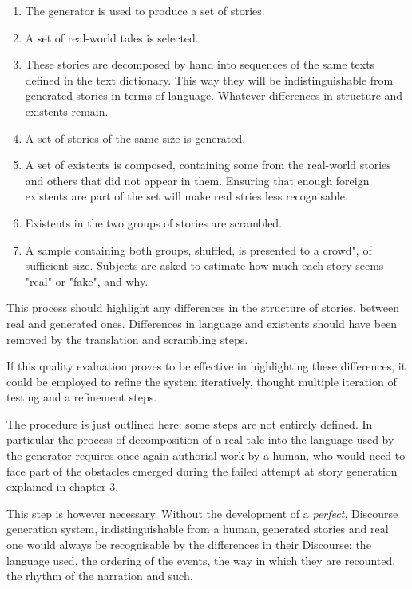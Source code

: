 \documentclass[12pt,a4paper,oneside]{report}
\begin{document}
\begin{enumerate}\setlength{\itemsep}{0pt}
\item The generator is used to produce a set of stories.
\item A set of real-world tales is selected. 
\item These stories are decomposed by hand into sequences of the same texts defined in the text dictionary. This way they will be indistinguishable from generated stories in terms of language. Whatever differences in structure and existents remain.
\item A set of stories of the same size is generated.
\item A set of existents is composed, containing some from the real-world stories and others that did not appear in them. Ensuring that enough foreign existents are part of the set will make real stries less recognisable.
\item Existents in the two groups of stories are scrambled.
\item A sample containing both groups, shuffled, is presented to a crowd", of sufficient size. Subjects are asked to estimate how much each story seems "real" or "fake", and why.
\end{enumerate}

This process should highlight any differences in the structure of stories, between real and generated ones. Differences in language and existents should have been removed by the translation and scrambling steps.

If this quality evaluation proves to be effective in highlighting these differences, it could be employed to refine the system iteratively, thought multiple iteration of testing and a refinement steps.

\bigskip

The procedure is just outlined here: some steps are not entirely defined. In particular the process of decomposition of a real tale into the language used by the generator requires once again authorial work by a human, who would need to face part of the obstacles emerged during the failed attempt at story generation explained in chapter 3.

This step is however necessary. Without the development of a \textit{perfect}, Discourse generation system, indistinguishable from a human, generated stories and real one would always be recognisable by the differences in their Discourse: the language used, the ordering of the events, the way in which they are recounted, the rhythm of the narration and such.
\end{document}
